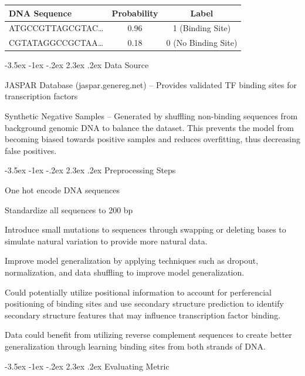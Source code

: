 \documentclass{report}
\makeatletter
\renewcommand\section{\@startsection{section}{1}{\z@}%
  {-3.5ex \@plus -1ex \@minus -.2ex}%
  {2.3ex \@plus.2ex}%
  {\normalfont\Large\bfseries}}
\makeatother
\begin{document}
\begin{longtable}[]{@{}lcc@{}}
\toprule\noalign{}
DNA Sequence & Probability & Label \\
\midrule\noalign{}
\endhead
\bottomrule\noalign{}
\endlastfoot
ATGCCGTTAGCGTAC\ldots{} & 0.96 & 1 (Binding Site) \\
CGTATAGGCCGCTAA\ldots{} & 0.18 & 0 (No Binding Site) \\
\end{longtable}

\newpage

\section{Data Source}\label{data-source}

JASPAR Database (jaspar.genereg.net) -- Provides validated TF binding
sites for transcription factors

Synthetic Negative Samples -- Generated by shuffling non-binding
sequences from background genomic DNA to balance the dataset. This
prevents the model from becoming biased towards positive samples and
reduces overfitting, thus decreasing false positives.

\section{Preprocessing Steps}\label{preprocessing-steps}

One hot encode DNA sequences

Standardize all sequences to 200 bp

Introduce small mutations to sequences through swapping or deleting
bases to simulate natural variation to provide more natural data.

Improve model generalization by applying techniques such as dropout,
normalization, and data shuffling to improve model generalization.

Could potentially utilize positional information to account for
perferencial positioning of binding sites and use secondary structure
prediction to identify secondary structure features that may influence
transcription factor binding.

Data could benefit from utilizing reverse complement sequences to create
better generalization through learning binding sites from both strands
of DNA.

\section{Evaluating Metric}\label{evaluating-metric}
\end{document}
